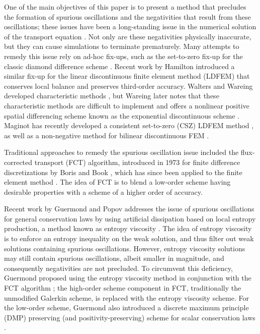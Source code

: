 One of the main objectives of this paper is to present a method that precludes
the formation of spurious oscillations and the negativities that result from
these oscillations; these issues have been a long-standing issue in the
numerical solution of the transport equation \cite{lanthrop}.
Not only are these negativities physically inaccurate, but they can cause
simulations to terminate prematurely. Many attempts to remedy this
issue rely on ad-hoc fix-ups, such as the set-to-zero fix-up for the
classic diamond difference scheme \cite{lewis}. Recent work by Hamilton
introduced a similar fix-up for the linear discontinuous finite element
method (LDFEM) that conserves local balance and preserves third-order accuracy.
Walters and Wareing developed characteristic methods \cite{walters_NC}, but
Wareing later notes that these characteristic methods are difficult to
implement and offers a nonlinear positive spatial differencing scheme
known as the exponential discontinuous scheme \cite{wareing}.
Maginot has recently developed a consistent set-to-zero (CSZ) LDFEM
method \cite{maginot}, as well as a non-negative method for bilinear
discontinuous FEM \cite{maginot_mc2015}.

Traditional approaches to remedy the spurious oscillation issue included
the flux-corrected transport (FCT) algorithm, introduced in 1973 for finite
difference discretizations
by Boris and Book \cite{borisbook}, which has since been applied to the finite
element method \cite{kuzmin_FCT}. The idea of FCT is to blend a low-order scheme
having desirable properties with a scheme of a higher order of accuracy.

Recent work by Guermond and Popov addresses the issue of spurious oscillations
for general conservation laws by using artificial dissipation based on
local entropy production, a method known as entropy viscosity \cite{guermond_ev}.
The idea of entropy viscosity is to enforce an entropy inequality on the weak solution,
and thus filter out weak solutions containing spurious oscillations. However,
entropy viscosity solutions may still contain spurious
oscillations, albeit smaller in magnitude, and consequently negativities
are not precluded. To circumvent this deficiency, Guermond proposed using
the entropy viscosity method in conjunction with the FCT
algorithm \cite{guermond_secondorder}; the high-order scheme component in FCT,
traditionally the unmodified Galerkin scheme, is replaced with the entropy
viscosity scheme.
For the low-order
scheme, Guermond also introduced
a discrete maximum principle (DMP) preserving (and positivity-preserving)
scheme for scalar
conservation laws \cite{guermond_firstorder}.

